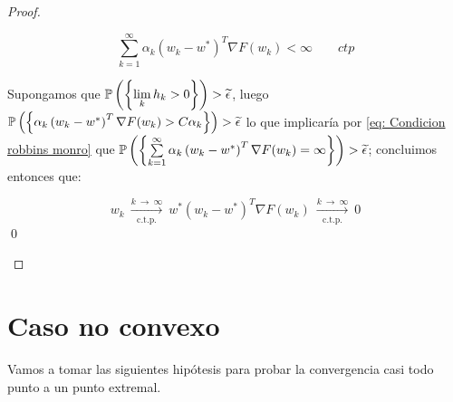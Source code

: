 \begin{proof}
\begin{enumerate}
		\begin{equation*}
		\sum\limits_{k=1}^{\infty} {\alpha_k \left(w_k - w^* \right)^T\nabla F(w_k)} < \infty \qquad ctp
		\end{equation*}
		
		Supongamos que $\mathbb{P}\left(\left\lbrace\lim\limits_{k} {h_k} > 0\right\rbrace\right) > \widetilde{\epsilon}$, luego $\mathbb{P}\left(\left\lbrace\alpha_k \left(w_k - w^* \right)^T\nabla F(w_k) > C\alpha_k\right\rbrace\right) > \widetilde{\epsilon}$ lo que implicar\'ia por \ref{eq: Condicion robbins monro} que $\mathbb{P}\left(\left\lbrace\sum\limits_{k=1}^{\infty} {\alpha_k \left(w_k - w^* \right)^T\nabla F(w_k)} = \infty\right\rbrace\right) > \widetilde{\epsilon}$; concluimos entonces que:
		
			\begin{subequations}
			\begin{equation}
			w_k \ \xrightarrow[\text{c.t.p.}]{k \ \rightarrow \ \infty } \ w^*
			\end{equation}
			\begin{equation}
			\left(w_k - w^*\right)^T \nabla F(w_k) \ \xrightarrow[\text{c.t.p.}]{k \ \rightarrow \ \infty } \ 0
			\end{equation}
		\end{subequations}\qed
		
	\end{enumerate}
	
\end{proof}

\section{Caso no convexo}

Vamos a tomar las siguientes hip\'otesis para probar la convergencia casi todo punto a un punto extremal.

